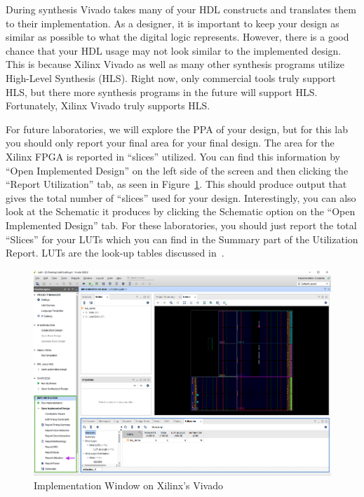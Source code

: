 \documentclass{article}
\begin{document}
During synthesis Vivado takes many of your HDL constructs and
translates them to their implementation.  As a designer, it is
important to keep your design as similar as possible to what the
digital logic represents.  However, there is a good chance that your
HDL usage may not look similar to the implemented design.  This is
because Xilinx Vivado
as well as many other synthesis programs utilize High-Level Synthesis
(HLS).  Right now, only commercial tools truly support HLS, but there
more synthesis programs in the future will support HLS.  Fortunately,
Xilinx Vivado truly supports HLS.

For future laboratories, we will explore the PPA of your design, but
for this lab you should only report your final area for your final design.
The area for the Xilinx FPGA is reported in 
``slices'' utilized.  You can find this information by ``Open
Implemented Design'' on the left side of the screen and then clicking
the ``Report Utilization'' tab, as seen in
Figure~\ref{utilization.fig}.    
This should produce output that
gives the total number of ``slices'' used for your design.
Interestingly, you can also look at the Schematic it produces by
clicking the Schematic option on the ``Open Implemented Design'' tab.
For these laboratories, you should just report the total ``Slices''
for your LUTs which you can find in the Summary part of the
Utilization Report.  LUTs are the look-up tables discussed
in~\cite{7086413}.
\begin{figure}
  \centering
  \includegraphics[scale=0.2]{Utilization.png}
  \caption{Implementation Window on Xilinx's Vivado}
  \label{utilization.fig}
\end{figure}
\end{document}
